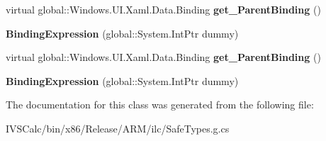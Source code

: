\begin{DoxyCompactItemize}
virtual global\+::\+Windows.\+U\+I.\+Xaml.\+Data.\+Binding {\bfseries get\+\_\+\+Parent\+Binding} ()
\item 
\mbox{\label{class_windows_1_1_u_i_1_1_xaml_1_1_data_1_1_binding_expression_a52ea6871517ce801ff1319a1b8a6dac9}} 
{\bfseries Binding\+Expression} (global\+::\+System.\+Int\+Ptr dummy)
\item 
\mbox{\label{class_windows_1_1_u_i_1_1_xaml_1_1_data_1_1_binding_expression_a1622dda669d5faadbff83a584135fa04}} 
virtual global\+::\+Windows.\+U\+I.\+Xaml.\+Data.\+Binding {\bfseries get\+\_\+\+Parent\+Binding} ()
\item 
\mbox{\label{class_windows_1_1_u_i_1_1_xaml_1_1_data_1_1_binding_expression_a52ea6871517ce801ff1319a1b8a6dac9}} 
{\bfseries Binding\+Expression} (global\+::\+System.\+Int\+Ptr dummy)
\end{DoxyCompactItemize}


The documentation for this class was generated from the following file\+:\begin{DoxyCompactItemize}
\item 
I\+V\+S\+Calc/bin/x86/\+Release/\+A\+R\+M/ilc/Safe\+Types.\+g.\+cs\end{DoxyCompactItemize}
